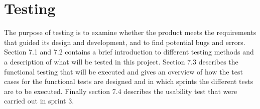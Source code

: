 \chapter{Testing}

	The purpose of testing is to examine whether the product meets the requirements that guided its design and development, and to find potential bugs and errors. Section 7.1 and 7.2 contains a brief introduction to different testing methods and a description of what will be tested in this project. Section 7.3 describes the functional testing that will be executed and gives an overview of how the test cases for the functional tests are designed and in which sprints the different tests are to be executed. Finally section 7.4 describes the usability test that were carried out in sprint 3.